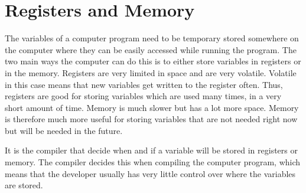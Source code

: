  

\section{Registers and Memory}
\label{sec:regmem}
 

The variables of a computer program need to be temporary stored somewhere on the computer where they can be easily accessed while running the program.
The two main ways the computer can do this is to either store variables in registers or in the memory.
Registers are very limited in space and are very volatile.
Volatile in this case means that new variables get written to the register often.
Thus, registers are good for storing variables which are used many times, in a very short amount of time.
Memory is much slower but has a lot more space.
Memory is therefore much more useful for storing variables that are not needed right now but will be needed in the future.


It is the compiler that decide when and if a variable will be stored in registers or memory.
The compiler decides this when compiling the computer program, which means that the developer usually has very little control over where the variables are stored.


